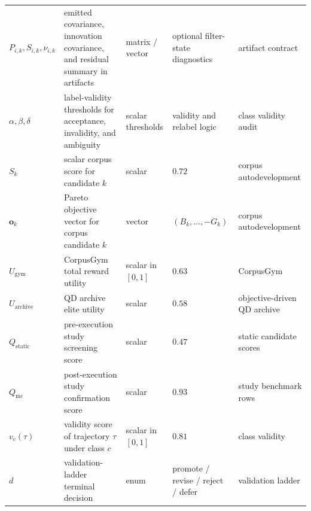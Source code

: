 \begin{tabularx}{\textwidth}{>{\raggedright\arraybackslash}p{}X>{\raggedright\arraybackslash}p{}>{\raggedright\arraybackslash}p{}>{\raggedright\arraybackslash}p{}}
\(P_{i,k}, S_{i,k}, \nu_{i,k}\) & emitted covariance, innovation covariance, and residual summary in artifacts & matrix / vector & optional filter-state diagnostics & artifact contract \\
\(\alpha, \beta, \delta\) & label-validity thresholds for acceptance, invalidity, and ambiguity & scalar thresholds & validity and relabel logic & class validity audit \\
\(S_k\) & scalar corpus score for candidate \(k\) & scalar & \(0.72\) & corpus autodevelopment \\
\(\mathbf{o}_k\) & Pareto objective vector for corpus candidate \(k\) & vector & \((B_k,\dots,-G_k)\) & corpus autodevelopment \\
\(U_{\text{gym}}\) & CorpusGym total reward utility & scalar in \([0,1]\) & \(0.63\) & CorpusGym \\
\(U_{\text{archive}}\) & QD archive elite utility & scalar & \(0.58\) & objective-driven QD archive \\
\(Q_{\text{static}}\) & pre-execution study screening score & scalar & \(0.47\) & static candidate scores \\
\(Q_{\text{mc}}\) & post-execution study confirmation score & scalar & \(0.93\) & study benchmark rows \\
\(v_c(\tau)\) & validity score of trajectory \(\tau\) under class \(c\) & scalar in \([0,1]\) & \(0.81\) & class validity \\
\(d\) & validation-ladder terminal decision & enum & promote / revise / reject / defer & validation ladder \\
\bottomrule
\end{tabularx}
